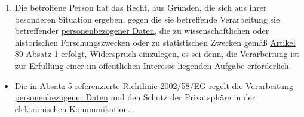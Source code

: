 \begin{enumerate}
  \item Die betroffene Person hat das Recht, aus Gründen, die sich aus ihrer besonderen Situation ergeben, gegen die sie
   betreffende Verarbeitung sie betreffender \hyperref[itm:04-1]{personenbezogener Daten}, die zu wissenschaftlichen oder historischen
   Forschungszwecken oder zu statistischen Zwecken gemäß \hyperref[itm:89-1]{Artikel 89 Absatz 1} erfolgt, Widerspruch
   einzulegen, es sei denn, die Verarbeitung ist zur Erfüllung einer im öffentlichen Interesse liegenden Aufgabe
   erforderlich.
  \label{itm:21-6}

\end{enumerate}


\begin{itemize}

  \item Die in \hyperref[itm:21-5]{Absatz 5} referenzierte
   \href{https://eur-lex.europa.eu/legal-content/DE/TXT/HTML/?uri=CELEX:32002L0058&qid=1659212895940&from=DE}
    {Richtlinie 2002/58/EG} regelt die Verarbeitung \hyperref[itm:04-1]{personenbezogener Daten} und den Schutz der Privatsphäre in der
    elektronischen Kommunikation.

\end{itemize}





